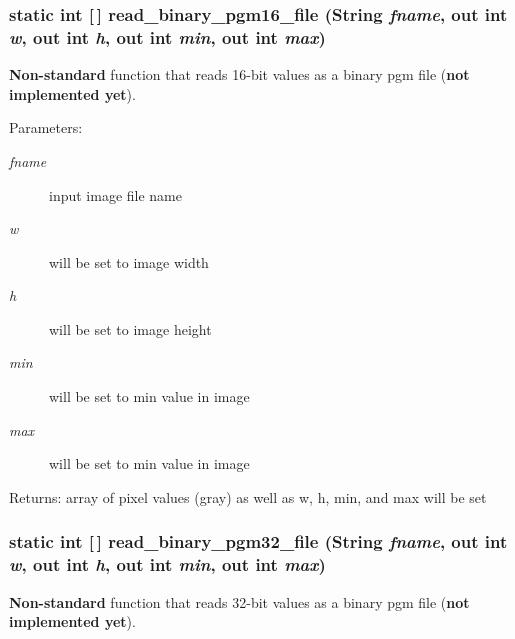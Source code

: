 \subsubsection{\setlength{\rightskip}{0pt plus 5cm}static int [$\,$] read\_\-binary\_\-pgm16\_\-file (String {\em fname}, out int {\em w}, out int {\em h}, out int {\em min}, out int {\em max})\hspace{0.3cm}{\tt  [static]}}\label{class_c_s_image_viewer_1_1pnm_helper_b5890bff21ce0535e4425a166e8dc7b6}


{\bf Non-standard} function that reads 16-bit values as a binary pgm file ({\bf not implemented yet}). 

\begin{Desc}
\item[Parameters:]
\begin{description}
\item[{\em fname}]input image file name \item[{\em w}]will be set to image width \item[{\em h}]will be set to image height \item[{\em min}]will be set to min value in image \item[{\em max}]will be set to min value in image\end{description}
\end{Desc}
\begin{Desc}
\item[Returns:]array of pixel values (gray) as well as w, h, min, and max will be set \end{Desc}
\subsubsection{\setlength{\rightskip}{0pt plus 5cm}static int [$\,$] read\_\-binary\_\-pgm32\_\-file (String {\em fname}, out int {\em w}, out int {\em h}, out int {\em min}, out int {\em max})\hspace{0.3cm}{\tt  [static]}}\label{class_c_s_image_viewer_1_1pnm_helper_5e15c7534f8d2fad9be751a869dc5efe}


{\bf Non-standard} function that reads 32-bit values as a binary pgm file ({\bf not implemented yet}). 

